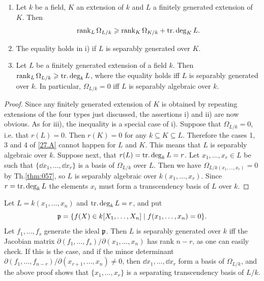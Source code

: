 \documentclass[../main]{subfiles}
\begin{document}
\begin{partheorem}
\label{thm:059}
\begin{enumerate}
    \item[i)] Let $k$ be a field, $K$ an extension of $k$ and $L$ a finitely generated extension of $K$. Then \[\operatorname{rank}_L \Omega_{L/k} \geqslant \operatorname{rank}_K \Omega_{K/k} + \operatorname{tr. deg}_K L.\]
    \item[ii)] The equality holds in i) if $L$ is separably generated over $K$.
    \item[iii)] Let $L$ be a finitely generated extension of a field $k$. Then \newline $\operatorname{rank}_L \Omega_{L/k} \geqslant \operatorname{tr. deg}_k L$, where the equality holds iff $L$ is separably generated over $k$. In particular, $\Omega_{L/k} = 0$ iff $L$ is separably algebraic over $k$.
\end{enumerate}
\end{partheorem}

\begin{proof}
Since any finitely generated extension of $K$ is obtained by repeating extensions of the four types just discussed, the assertions i) and ii) are now obvious. As for iii), the inequality is a special case of i). Suppose that $\Omega_{L/k} = 0$, i.e. that $r(L) = 0$. Then $r(K) = 0$ for any $k \subseteq K \subseteq L$. Therefore the cases 1, 3 and 4 of \ref{27.A} cannot happen for $L$ and $K$. This means that $L$ is separably algebraic over $k$. Suppose next, that $r(L) = \operatorname{tr. deg}_k L = r$. Let $x_1, \ldots, x_r \in L$ be such that $\{\dd x_1, \ldots, \dd x_r\}$ is a basis of $\Omega_{L/k}$ over $L$. Then we have $\Omega_{L/k(x_1, \ldots, x_r)} = 0$ by Th.\ref{thm:057}, so $L$ is separably algebraic over $k(x_1, \ldots, x_r)$. Since $r = \operatorname{tr. deg}_k L$ the elements $x_i$ must form a transcendency basis of $L$ over $k$.
\end{proof}

\begin{remark}
Let $L = k(x_1, \ldots, x_n)$ and $\operatorname{tr. deg}_k L = r$, and put\[\mathfrak{p} = \{f(X) \in k[X_1, \dots, X_n] \mid f(x_1, \dots, x_n) = 0\}.\]
Let $f_1, \ldots, f_s$ generate the ideal $\mathfrak{p}$. Then $L$ is separably generated over $k$ iff the Jacobian matrix $\partial(f_1, \ldots, f_s)/\partial(x_1, \ldots, x_n)$ has rank $n - r$, as one can easily check. If this is the case, and if the minor determinant \newline $\partial(f_1, \ldots, f_{n - r})/\partial(x_{r + 1}, \ldots, x_n) \ne 0$, then $\dd x_1, \ldots, \dd x_r$ form a basis of $\Omega_{L/k}$, and the above proof shows that $\{x_1, \ldots, x_r\}$ is a separating transcendency basis of $L/k$.
\end{remark}
\end{document}
